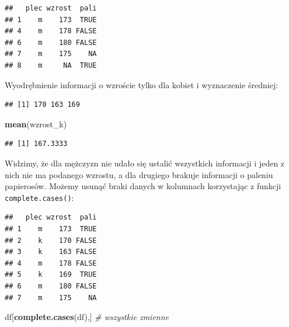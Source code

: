 \documentclass[]{book}
\newenvironment{Shaded}{\begin{snugshade}}{\end{snugshade}}
\newcommand{\KeywordTok}[1]{\textcolor[rgb]{0.13,0.29,0.53}{\textbf{#1}}}
\newcommand{\StringTok}[1]{\textcolor[rgb]{0.31,0.60,0.02}{#1}}
\newcommand{\CommentTok}[1]{\textcolor[rgb]{0.56,0.35,0.01}{\textit{#1}}}
\newcommand{\OperatorTok}[1]{\textcolor[rgb]{0.81,0.36,0.00}{\textbf{#1}}}
\newcommand{\NormalTok}[1]{#1}
\begin{document}
\begin{verbatim}
##   plec wzrost  pali
## 1    m    173  TRUE
## 4    m    178 FALSE
## 6    m    180 FALSE
## 7    m    175    NA
## 8    m     NA  TRUE
\end{verbatim}

Wyodrębnienie informacji o wzroście tylko dla kobiet i wyznaczenie
średniej:

\begin{Shaded}
\end{Shaded}

\begin{verbatim}
## [1] 170 163 169
\end{verbatim}

\begin{Shaded}
\begin{Highlighting}[]
\KeywordTok{mean}\NormalTok{(wzrost_k)}
\end{Highlighting}
\end{Shaded}

\begin{verbatim}
## [1] 167.3333
\end{verbatim}

Widzimy, że dla mężczyzn nie udało się ustalić wszystkich informacji i
jeden z nich nie ma podanego wzrostu, a dla drugiego brakuje informacji
o paleniu papierosów. Możemy usunąć braki danych w kolumnach korzystając
z funkcji \texttt{complete.cases()}:

\begin{Shaded}
\end{Shaded}

\begin{verbatim}
##   plec wzrost  pali
## 1    m    173  TRUE
## 2    k    170 FALSE
## 3    k    163 FALSE
## 4    m    178 FALSE
## 5    k    169  TRUE
## 6    m    180 FALSE
## 7    m    175    NA
\end{verbatim}

\begin{Shaded}
\begin{Highlighting}[]
\NormalTok{df[}\KeywordTok{complete.cases}\NormalTok{(df),] }\CommentTok{# wszystkie zmienne}
\end{Highlighting}
\end{Shaded}
\end{document}
